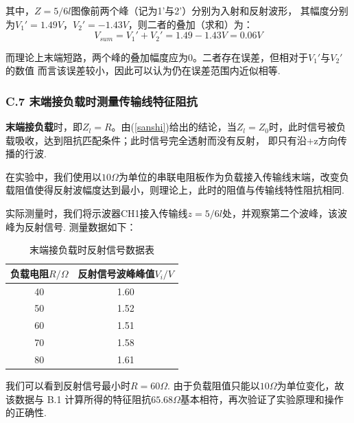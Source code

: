 \documentclass[UTF8]{ctexart}
\begin{document}
其中，$Z=5/6l$图像前两个峰（记为1'与2'）分别为入射和反射波形，
其幅度分别为$V_1'=1.49V$，$V_2'=-1.43V$，则二者的叠加（求和）为：
\begin{equation}
    V_{sum}=V_1'+V_2'=1.49-1.43V=0.06V
\end{equation}

而理论上末端短路，两个峰的叠加幅度应为0。二者存在误差，但相对于$V_1'$与$V_2'$的数值
而言该误差较小，因此可以认为仍在误差范围内近似相等.

\subsubsection*{C.7 末端接负载时测量传输线特征阻抗}
\textbf{末端接负载}时，即$Z_l=R$。由(\ref{sanshi})给出的结论，当$Z_l=Z_0$时，此时信号被负载吸收，达到阻抗匹配条件；此时信号完全透射而没有反射，
即只有沿+z方向传播的行波.\par

在实验中，我们使用以$10\Omega$为单位的串联电阻板作为负载接入传输线末端，改变负载阻值使得反射波幅度达到最小，则理论上，此时的阻值与传输线特性阻抗相同.\par
实际测量时，我们将示波器CH1接入传输线$z=5/6l$处，并观察第二个波峰，该波峰为反射信号. 测量数据如下：
\begin{table}[H]
    \centering
\begin{tabular}{|c|c|}
        \hline
        负载电阻$R/\Omega$&反射信号波峰峰值$V_i/V$\\
        \hline
        40&1.60\\
        \hline
        50&1.52\\ 
        \hline
        60&1.51\\ 
        \hline
        70&1.58\\ 
        \hline
        80&1.61\\ 
        \hline
    \end{tabular}  
    \caption{末端接负载时反射信号数据表} 
\end{table} 
我们可以看到反射信号最小时$R=60\Omega$. 由于负载阻值只能以$10\Omega$为单位变化，故该数据与 B.1 计算所得的特征阻抗$65.68\Omega$基本相符，再次验证了实验原理和操作的正确性.
\end{document}

